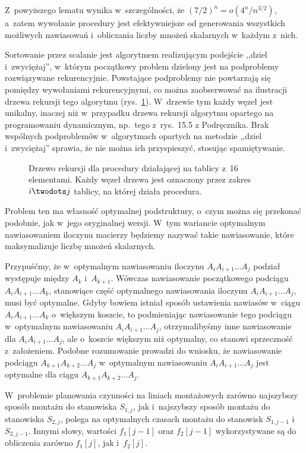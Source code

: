 Z~powyższego lematu wynika w~szczególności, że $(7/2)^n=o(4^n\!/n^{3/2})$, a~zatem wywołanie procedury  jest efektywniejsze od generowania wszystkich możliwych nawiasowań i~obliczania liczby mnożeń skalarnych w~każdym z~nich.

\exercise %
Sortowanie przez scalanie jest algorytmem realizującym podejście ,,dziel i~zwyciężaj'', w~którym początkowy problem dzielony jest na podproblemy rozwiązywane rekurencyjnie.
Powstające podproblemy nie powtarzają się pomiędzy wywołaniami rekurencyjnymi, co można zaobserwować na ilustracji drzewa rekursji tego algorytmu (rys.\ \ref{fig:15.3-2}).
W~drzewie tym każdy węzeł jest unikalny, inaczej niż w~przypadku drzewa rekursji algorytmu opartego na programowaniu dynamicznym, np.\ tego z~rys.\ 15.5 z Podręcznika.
Brak wspólnych podproblemów w~algorytmach opartych na metodzie ,,dziel i~zwyciężaj'' sprawia, że nie można ich przyspieszyć, stosując spamiętywanie.
\begin{figure}[!ht]
	\centering 
	\caption{Drzewo rekursji dla procedury  działającej na tablicy z~16 elementami.
Każdy węzeł drzewa jest oznaczony przez zakres $i\twodots j$ tablicy, na której działa procedura.} \label{fig:15.3-2}
\end{figure}

\exercise %
Problem ten ma własność optymalnej podstruktury, o~czym można się przekonać podobnie, jak w~jego oryginalnej wersji.
W~tym wariancie optymalnym nawiasowaniem iloczynu macierzy będziemy nazywać takie nawiasowanie, które maksymalizuje liczbę mnożeń skalarnych.

Przypuśćmy, że w~optymalnym nawiasowaniu iloczynu $A_iA_{i+1}\dots A_j$ podział występuje między $A_k$ i~$A_{k+1}$.
Wówczas nawiasowanie początkowego podciągu $A_iA_{i+1}\dots A_k$, stanowiące część optymalnego nawiasowania iloczynu $A_iA_{i+1}\dots A_j$, musi być optymalne.
Gdyby bowiem istniał sposób ustawienia nawiasów w~ciągu $A_iA_{i+1}\dots A_k$ o~większym koszcie, to podmieniając nawiasowanie tego podciągu w~optymalnym nawiasowaniu $A_iA_{i+1}\dots A_j$, otrzymalibyśmy inne nawiasowanie dla $A_iA_{i+1}\dots A_j$, ale o~koszcie większym niż optymalny, co stanowi sprzeczność z~założeniem.
Podobne rozumowanie prowadzi do wniosku, że nawiasowanie podciągu $A_{k+1}A_{k+2}\dots A_j$ w~optymalnym nawiasowaniu $A_iA_{i+1}\dots A_j$ jest optymalne dla ciągu $A_{k+1}A_{k+2}\dots A_j$.

\exercise %
W~problemie planowania czynności na liniach montażowych zarówno najszybszy sposób montażu do stanowiska $S_{1,j}$, jak i~najszybszy sposób montażu do stanowiska $S_{2,j}$, polega na optymalnych czasach montażu do stanowisk $S_{1,j-1}$ i~$S_{2,j-1}$.
Innymi słowy, wartości $f_1[j-1]$ oraz $f_2[j-1]$ wykorzystywane są do obliczenia zarówno $f_1[j]$, jak i~$f_2[j]$.

